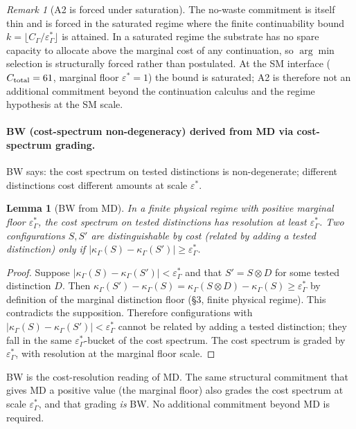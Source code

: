 \documentclass[11pt]{article}
\newtheorem{lemma}[theorem]{Lemma}
\theoremstyle{remark}
\newtheorem{remark}[theorem]{Remark}
\newcommand{\G}{\Gamma}
\newcommand{\Cost}{\kappa}
\newcommand{\floor}{\varepsilon^{\!*}_{\G}}
\newcommand{\eps}{\varepsilon^{\!*}}
\begin{document}
\begin{remark}[A2 is forced under saturation]
The no-waste commitment is itself thin and is forced in the saturated regime where the finite continuability bound $k = \lfloor C_\G/\floor \rfloor$ is attained.  In a saturated regime the substrate has no spare capacity to allocate above the marginal cost of any continuation, so $\arg\min$ selection is structurally forced rather than postulated.  At the SM interface ($C_{\rm total} = 61$, marginal floor $\eps = 1$) the bound is saturated; A2 is therefore not an additional commitment beyond the continuation calculus and the regime hypothesis at the SM scale.
\end{remark}

\paragraph{BW (cost-spectrum non-degeneracy) derived from MD via cost-spectrum grading.}

BW says: the cost spectrum on tested distinctions is non-degenerate; different distinctions cost different amounts at scale $\eps$.

\begin{lemma}[BW from MD]\label{lem:bw}
In a finite physical regime with positive marginal floor $\floor$, the cost spectrum on tested distinctions has resolution at least $\floor$.  Two configurations $S, S'$ are distinguishable by cost (related by adding a tested distinction) only if $|\Cost_\G(S) - \Cost_\G(S')| \ge \floor$.
\end{lemma}
\begin{proof}
Suppose $|\Cost_\G(S) - \Cost_\G(S')| < \floor$ and that $S' = S \otimes D$ for some tested distinction $D$.  Then $\Cost_\G(S') - \Cost_\G(S) = \Cost_\G(S \otimes D) - \Cost_\G(S) \ge \floor$ by definition of the marginal distinction floor (\S 3, finite physical regime).  This contradicts the supposition.  Therefore configurations with $|\Cost_\G(S) - \Cost_\G(S')| < \floor$ cannot be related by adding a tested distinction; they fall in the same $\floor$-bucket of the cost spectrum.  The cost spectrum is graded by $\floor$, with resolution at the marginal floor scale.
\end{proof}

BW is the cost-resolution reading of MD.  The same structural commitment that gives MD a positive value (the marginal floor) also grades the cost spectrum at scale $\floor$, and that grading \emph{is} BW.  No additional commitment beyond MD is required.
\end{document}
